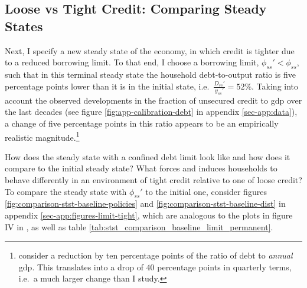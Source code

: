 \documentclass[a4paper,12pt]{article} %
\numberwithin{equation}{section} %
\numberwithin{figure}{section}
\numberwithin{table}{section}
\begin{document}
\subsection{Loose vs Tight Credit: Comparing Steady States}
\label{sec:limit-stst-tight}

Next, I specify a new steady state of the economy, in which credit is tighter due to a reduced borrowing limit. To that end, I choose a borrowing limit, $\phi_{ss}' < \phi_{ss}$, such that in this terminal steady state the household debt-to-output ratio is five percentage points lower than it is in the initial state, i.e.~$\frac{D_{ss}'}{y_{ss}'} = 52\%$. Taking into account the observed developments in the fraction of unsecured credit to \Gls{gdp} over the last decades (see figure \ref{fig:app-calibration-debt} in appendix \ref{sec-app:data}), a change of five percentage points in this ratio appears to be an empirically realistic magnitude.\footnote{\textcite{gl2017} consider a reduction by ten percentage points of the ratio of debt to \textit{annual} \Gls{gdp}. This translates into a drop of $40$ percentage points in quarterly terms, i.e.~a much larger change than I study.} 

How does the steady state with a confined debt limit look like and how does it compare to the initial steady state? What forces and induces households to behave differently in an environment of tight credit relative to one of loose credit? To compare the steady state with $\phi_{ss}'$ to the initial one, consider figures \ref{fig:comparison-stst-baseline-policies} and \ref{fig:comparison-stst-baseline-dist} in appendix \ref{sec-app:figures-limit-tight}, which are analogous to the plots in figure IV in \textcite[p.1443]{gl2017}, as well as table \ref{tab:stst_comparison_baseline_limit_permanent}. 
\end{document}
